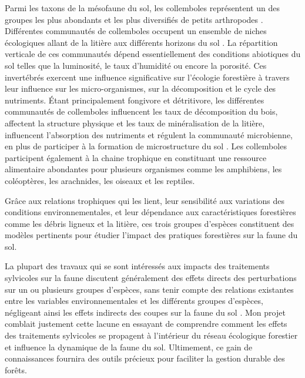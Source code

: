 Parmi les taxons de la mésofaune du sol, les collemboles représentent un des groupes les plus abondants et les plus diversifiés de petits arthropodes \citep{rusekBiodiversityCollembolaTheir1998}. 
Différentes communautés de collemboles occupent un ensemble de niches écologiques allant de la litière aux différents horizons du sol \citep{pongeVerticalDistributionCollembola2000}.
La répartition verticale de ces communautés dépend essentiellement des conditions abiotiques du sol telles que la luminosité, le taux d’humidité ou encore la porosité.
Ces invertébrés exercent une influence significative sur l'écologie forestière à travers leur influence sur les micro-organismes, sur la décomposition et le cycle des nutriments.
Étant principalement fongivore et détritivore, les différentes communautés de collemboles influencent les taux de décomposition du bois, affectent la structure physique et les taux de minéralisation de la litière, 
influencent l'absorption des nutriments et régulent la communauté microbienne, en plus de participer à la formation de microstructure du sol \citep{Petersen1982ComparativeAnalysisa,Neher2012Linkinginvertebrate,Maass2015Functionalrole,Potapov2016Connectingtaxonomy}. 
Les collemboles participent également à la chaine trophique en constituant une ressource alimentaire abondantes pour plusieurs organismes comme les amphibiens, les coléoptères, les arachnides, les oiseaux et les reptiles.

Grâce aux relations trophiques qui les lient, leur sensibilité aux variations des conditions environnementales, et leur dépendance aux caractéristiques forestières comme les débris ligneux et la litière, 
ces trois groupes d'espèces constituent des modèles pertinents pour étudier l'impact des pratiques forestières sur la faune du sol. 

La plupart des travaux qui se sont intéressés aux impacts des traitements sylvicoles sur la faune discutent généralement des effets directs des perturbations sur un ou plusieurs groupes d'espèces, 
sans tenir compte des relations existantes entre les variables environnementales et les différents groupes d'espèces, 
négligeant ainsi les effets indirects des coupes sur la faune du sol \citep{josephIntegratingOccupancyModels2016,Pollierer2021Diversityfunctional,Kudrin2023metaanalysiseffects}. 
Mon projet comblait justement cette lacune en essayant de comprendre comment les effets des traitements sylvicoles se propagent à l’intérieur du réseau écologique forestier et influence la dynamique de la faune du sol.  
Ultimement, ce gain de connaissances fournira des outils précieux pour faciliter la gestion durable des forêts.


